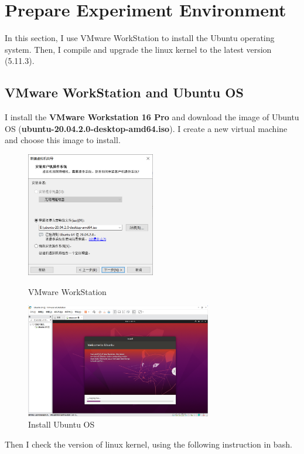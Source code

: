 \documentclass[UTF8,10pt,a4paper]{article}
\theoremstyle{Problem}
\theoremstyle{Solution}
\begin{document}
\thispagestyle{FirstPageStyle}

\section{Prepare Experiment Environment}
In this section, I use VMware WorkStation to install the Ubuntu operating system. Then, I compile and upgrade the linux kernel to the latest version (5.11.3).
\subsection{VMware WorkStation and Ubuntu OS}
I install the \textbf{VMware Workstation 16 Pro} and download the image of Ubuntu OS (\textbf{ubuntu-20.04.2.0-desktop-amd64.iso}). I create a new virtual machine and choose this image to install.

\begin{figure}[H]
\begin{minipage}[H]{0.5\linewidth}
    \centering
    \includegraphics[width=160pt]{1.png}
    \caption{VMware WorkStation}
    \label{1}
\end{minipage}
\begin{minipage}[H]{0.5\linewidth}
    \centering
    \includegraphics[width=230pt]{2.png}
    \caption{Install Ubuntu OS}
    \label{2}
\end{minipage}
\end{figure}

Then I check the version of linux kernel, using the following instruction in bash.
\end{document}
